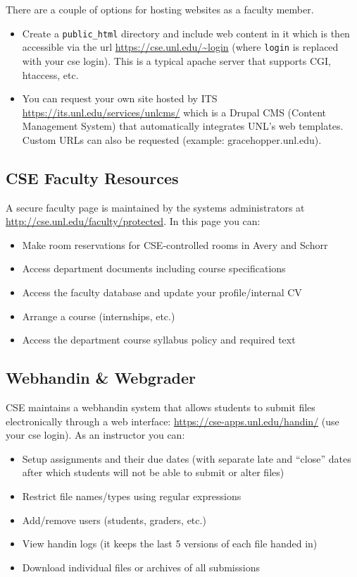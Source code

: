\documentclass[12pt]{scrartcl}
\begin{document}
There are a couple of options for hosting websites as a 
faculty member.

\begin{itemize}
  \item Create a \texttt{public_html} directory
  and include web content in it which is then accessible via the
  url \url{https://cse.unl.edu/~login} (where \texttt{login}
  is replaced with your cse login).  This is a typical apache server
  that supports CGI, htaccess, etc.
  \item You can request your own site hosted by ITS
  \url{https://its.unl.edu/services/unlcms/} which is a Drupal
  CMS (Content Management System) that automatically 
  integrates UNL's web templates.  Custom URLs can also
  be requested (example: gracehopper.unl.edu).
\end{itemize}

\subsection{CSE Faculty Resources}

A secure faculty page is maintained by the systems administrators
at \url{http://cse.unl.edu/faculty/protected}.  In this page you can:
\begin{itemize}
  \item Make room reservations for CSE-controlled rooms in Avery and Schorr
  \item Access department documents including course specifications
  \item Access the faculty database and update your profile/internal CV
  \item Arrange a course (internships, etc.)
  \item Access the department course syllabus policy and required text
\end{itemize}

\subsection{Webhandin \& Webgrader}

CSE maintains a webhandin system that allows students to submit
files electronically through a web interface: \url{https://cse-apps.unl.edu/handin/} (use your cse login).  As an instructor you
can:
\begin{itemize}
  \item Setup assignments and their due dates (with separate late
and ``close'' dates after which students will not be able to
submit or alter files)
  \item Restrict file names/types using regular expressions
  \item Add/remove users (students, graders, etc.)
  \item View handin logs (it keeps the last 5 versions of
  each file handed in)
  \item Download individual files or archives of all submissions
\end{itemize}
\end{document}
